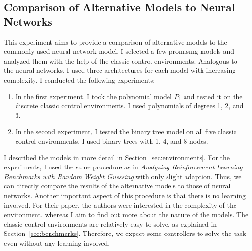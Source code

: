\subsection{Comparison of Alternative Models to Neural Networks}
This experiment aims to provide a comparison of alternative models to the commonly used neural network model. I selected a few promising models and analyzed them with the help of the classic control environments. Analogous to the neural networks, I used three architectures for each model with increasing complexity. I conducted the following experiments:
\begin{enumerate}[label=(\alph*)]
  \item In the first experiment, I took the polynomial model $P_1$ and tested it on the discrete classic control environments. I used polynomials of degrees 1, 2, and 3.
  \item In the second experiment, I tested the binary tree model on all five classic control environments. I used binary trees with 1, 4, and 8 nodes.
\end{enumerate}
I described the models in more detail in Section~\ref{sec:environments}. For the experiments, I used the same procedure as in \emph{Analyzing Reinforcement Learning Benchmarks with Random Weight Guessing} with only slight adaption. Thus, we can directly compare the results of the alternative models to those of neural networks. Another important aspect of this procedure is that there is no learning involved. For their paper, the authors were interested in the complexity of the environment, whereas I aim to find out more about the nature of the models. The classic control environments are relatively easy to solve, as explained in Section~\ref{sec:benchmarks}. Therefore, we expect some controllers to solve the task even without any learning involved.

